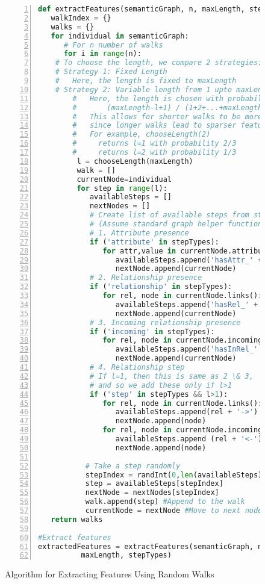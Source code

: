\documentclass[runningheads,a4paper]{llncs}
\begin{document}
\begin{figure}
\begin{lstlisting}[language=Python,numbers=left, stepnumber=1, frame=single]
def extractFeatures(semanticGraph, n, maxLength, stepTypes):
   walkIndex = {}
   walks = {}
   for individual in semanticGraph:
      # For n number of walks
      for i in range(n):
	# To choose the length, we compare 2 strategies:
	# Strategy 1: Fixed Length
	#   Here, the length is fixed to maxLength
	# Strategy 2: Variable length from 1 upto maxLength
        #   Here, the length is chosen with probability
        #       (maxLength-l+1) / (1+2+...+maxLength)
        #   This allows for shorter walks to be more dominant,
        #   since longer walks lead to sparser features.
        #   For example, chooseLength(2) 
        #     returns l=1 with probability 2/3
        #     returns l=2 with probability 1/3
         l = chooseLength(maxLength)  
         walk = []
         currentNode=individual
         for step in range(l):
            availableSteps = []
            nextNodes = []
            # Create list of available steps from stepTypes
            # (Assume standard graph helper functions below)
            # 1. Attribute presence
            if ('attribute' in stepTypes):
               for attr,value in currentNode.attributes():
                  availableSteps.append('hasAttr_' + attr)
                  nextNode.append(currentNode)
            # 2. Relationship presence
            if ('relationship' in stepTypes):
               for rel, node in currentNode.links():
                  availableSteps.append('hasRel_' + rel)
                  nextNode.append(currentNode)
            # 3. Incoming relationship presence
            if ('incoming' in stepTypes):
               for rel, node in currentNode.incomingLinks():
                  availableSteps.append('hasInRel_' + rel)
                  nextNode.append(currentNode)
            # 4. Relationship step 
            # If l=1, then this is same as 2 \& 3, 
            # and so we add these only if l>1
            if ('step' in stepTypes && l>1):
               for rel, node in currentNode.links():
                  availableSteps.append(rel + '->')
                  nextNode.append(node)
               for rel, node in currentNode.incomingLinks():
                  availableSteps.append (rel + '<-')
                  nextNode.append(node)
           
           # Take a step randomly
           stepIndex = randInt(0,len(availableSteps)-1)
           step = availableSteps[stepIndex]
           nextNode = nextNodes[stepIndex] 
           walk.append(step) #Append to the walk
           currentNode = nextNode #Move to next node
   return walks

#Extract features
extractedFeatures = extractFeatures(semanticGraph, n, 
          maxLength, stepTypes)
\end{lstlisting}
\caption{Algorithm for Extracting Features Using Random Walks}
\label{extractFeatures}
\end{figure}
\end{document}
